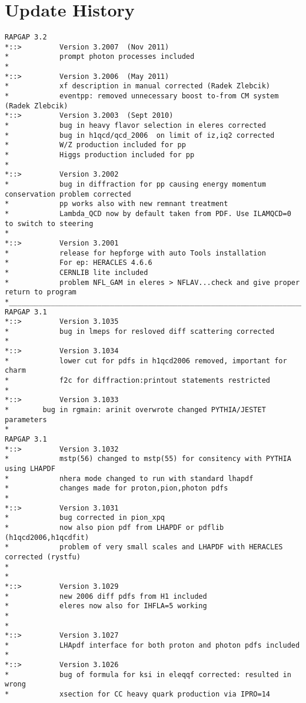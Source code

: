 \documentclass[10pt]{article} \usepackage{dina4}
\begin{document}
\section{Update History}
\begin{verbatim}
RAPGAP 3.2    
*::>         Version 3.2007  (Nov 2011)
*            prompt photon processes included
*      
*::>         Version 3.2006  (May 2011)
*            xf description in manual corrected (Radek Zlebcik)
*            eventpp: removed unnecessary boost to-from CM system (Radek Zlebcik)
*::>         Version 3.2003  (Sept 2010)
*            bug in heavy flavor selection in eleres corrected
*            bug in h1qcd/qcd_2006  on limit of iz,iq2 corrected
*            W/Z production included for pp
*            Higgs production included for pp
* 
*::>         Version 3.2002
*            bug in diffraction for pp causing energy momentum conservation problem corrected 
*            pp works also with new remnant treatment
*            Lambda_QCD now by default taken from PDF. Use ILAMQCD=0 to switch to steering 
*		
*::>         Version 3.2001
*            release for hepforge with auto Tools installation
*            For ep: HERACLES 4.6.6    
*            CERNLIB lite included
*            problem NFL_GAM in eleres > NFLAV...check and give proper return to program
*________________________________________________________________________
RAPGAP 3.1   
*::>         Version 3.1035
*            bug in lmeps for resloved diff scattering corrected
*		
*::>         Version 3.1034
*            lower cut for pdfs in h1qcd2006 removed, important for charm
*            f2c for diffraction:printout statements restricted
*		
*::>         Version 3.1033
*		 bug in rgmain: arinit overwrote changed PYTHIA/JESTET parameters
*
RAPGAP 3.1   
*::>         Version 3.1032
*            mstp(56) changed to mstp(55) for consitency with PYTHIA using LHAPDF
*            nhera mode changed to run with standard lhapdf
*            changes made for proton,pion,photon pdfs
*		
*::>         Version 3.1031
*            bug corrected in pion_xpq
*            now also pion pdf from LHAPDF or pdflib (h1qcd2006,h1qcdfit)
*            problem of very small scales and LHAPDF with HERACLES corrected (rystfu)
*		
*
*::>         Version 3.1029
*            new 2006 diff pdfs from H1 included
*            eleres now also for IHFLA=5 working
*		
*
*::>         Version 3.1027
*            LHApdf interface for both proton and photon pdfs included
*
*::>         Version 3.1026
*            bug of formula for ksi in eleqqf corrected: resulted in wrong
*            xsection for CC heavy quark production via IPRO=14

\end{verbatim}
\end{document}
